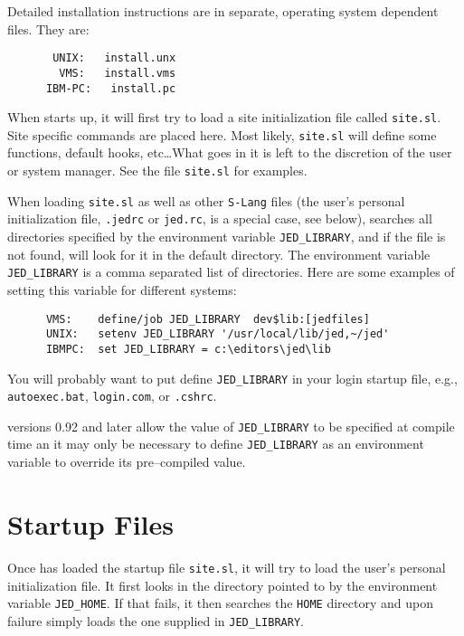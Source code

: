  Detailed installation instructions are in separate, operating system
 dependent files.  They are:
\begin{verbatim}
       UNIX:   install.unx
        VMS:   install.vms
      IBM-PC:   install.pc
\end{verbatim}

  When \jed{} starts up, it will first try to load a site initialization file
  called \verb|site.sl|.  Site specific commands are placed here.  Most
  likely, \verb|site.sl| will define some functions, default hooks,
  etc\ldots  What goes in it is left to the discretion of the user or system
  manager. See the file \verb|site.sl| for examples.

  When loading \verb|site.sl| as well as other \verb|S-Lang| files (the
  user's personal initialization file, \verb|.jedrc| or \verb|jed.rc|, is a
  special case, see below), \jed{} searches all directories specified by the
  environment variable \verb|JED_LIBRARY|, and if the file is not found, \jed{}
  will look for it in the default directory. The environment variable
  \verb|JED_LIBRARY| is a comma separated list of directories.  Here are
  some examples of setting this variable for different systems:

\begin{verbatim}
      VMS:    define/job JED_LIBRARY  dev$lib:[jedfiles]
      UNIX:   setenv JED_LIBRARY '/usr/local/lib/jed,~/jed'
      IBMPC:  set JED_LIBRARY = c:\editors\jed\lib
\end{verbatim} %


  You will probably want to put define \verb|JED_LIBRARY| in your login
  startup file, e.g., \verb|autoexec.bat|, \verb|login.com|, or
  \verb|.cshrc|.

  \jed{} versions 0.92 and later allow the value of \verb|JED_LIBRARY| to be
  specified at compile time an it may only be necessary to define
  \verb|JED_LIBRARY| as an environment variable to override its
  pre--compiled value.

\section{Startup Files}

  Once \jed{} has loaded the startup file \verb|site.sl|, it will try to load
  the user's personal initialization file.  It first looks in the directory
  pointed to by the environment variable \verb|JED_HOME|. If that fails, it
  then searches the \verb|HOME| directory and upon failure simply loads the
  one supplied in \verb|JED_LIBRARY|.

